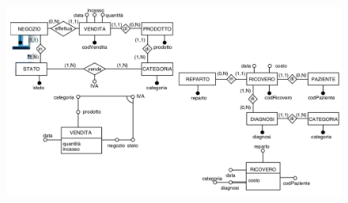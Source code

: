 \documentclass[a4paper, notitlepage, 9pt]{extreport}
\begin{document}
\begin{figure}[H]
	\centering
	\includegraphics[scale=0.4]{Creazione}
\end{figure}
\end{document}
